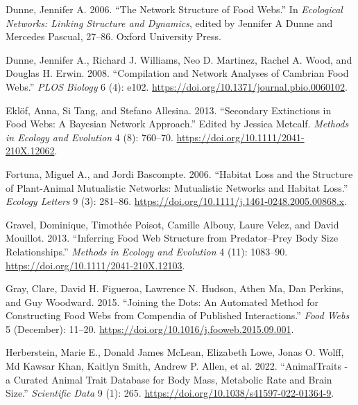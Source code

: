 \documentclass[
  letterpaper,
  DIV=11,
  numbers=noendperiod]{scrartcl}
\newlength{\cslhangindent}
\newenvironment{CSLReferences}[2] %
 {\begin{list}{}{%
  \setlength{\itemindent}{0pt}
  \setlength{\leftmargin}{0pt}
  \setlength{\parsep}{0pt}
  \ifodd #1
   \setlength{\leftmargin}{\cslhangindent}
   \setlength{\itemindent}{-1\cslhangindent}
  \fi
  \setlength{\itemsep}{#2\baselineskip}}}
 {\end{list}}
\begin{document}
\begin{CSLReferences}{1}{0}
Dunne, Jennifer A. 2006. {``The {Network Structure} of {Food Webs}.''}
In \emph{Ecological Networks: {Linking} Structure and Dynamics}, edited
by Jennifer A Dunne and Mercedes Pascual, 27--86. Oxford University
Press.

Dunne, Jennifer A., Richard J. Williams, Neo D. Martinez, Rachel A.
Wood, and Douglas H. Erwin. 2008. {``Compilation and {Network Analyses}
of {Cambrian Food Webs}.''} \emph{PLOS Biology} 6 (4): e102.
\url{https://doi.org/10.1371/journal.pbio.0060102}.

Eklöf, Anna, Si Tang, and Stefano Allesina. 2013. {``Secondary
Extinctions in Food Webs: A {Bayesian} Network Approach.''} Edited by
Jessica Metcalf. \emph{Methods in Ecology and Evolution} 4 (8): 760--70.
\url{https://doi.org/10.1111/2041-210X.12062}.

Fortuna, Miguel A., and Jordi Bascompte. 2006. {``Habitat Loss and the
Structure of Plant-Animal Mutualistic Networks: {Mutualistic} Networks
and Habitat Loss.''} \emph{Ecology Letters} 9 (3): 281--86.
\url{https://doi.org/10.1111/j.1461-0248.2005.00868.x}.

Gravel, Dominique, Timothée Poisot, Camille Albouy, Laure Velez, and
David Mouillot. 2013. {``Inferring Food Web Structure from
Predator--Prey Body Size Relationships.''} \emph{Methods in Ecology and
Evolution} 4 (11): 1083--90.
\url{https://doi.org/10.1111/2041-210X.12103}.

Gray, Clare, David H. Figueroa, Lawrence N. Hudson, Athen Ma, Dan
Perkins, and Guy Woodward. 2015. {``Joining the Dots: {An} Automated
Method for Constructing Food Webs from Compendia of Published
Interactions.''} \emph{Food Webs} 5 (December): 11--20.
\url{https://doi.org/10.1016/j.fooweb.2015.09.001}.

Herberstein, Marie E., Donald James McLean, Elizabeth Lowe, Jonas O.
Wolff, Md Kawsar Khan, Kaitlyn Smith, Andrew P. Allen, et al. 2022.
{``{AnimalTraits} - a Curated Animal Trait Database for Body Mass,
Metabolic Rate and Brain Size.''} \emph{Scientific Data} 9 (1): 265.
\url{https://doi.org/10.1038/s41597-022-01364-9}.


\end{CSLReferences}
\end{document}
